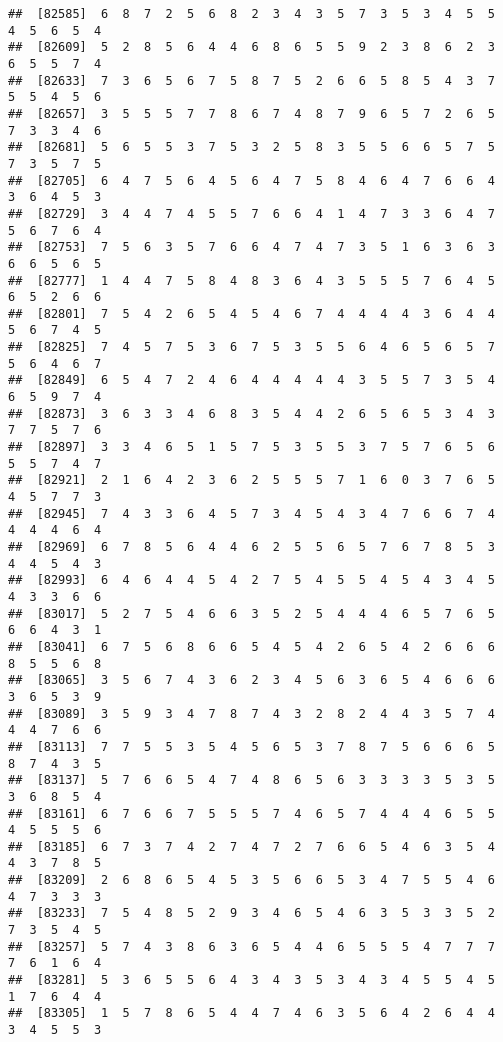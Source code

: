 \documentclass[
]{book}
\begin{document}
\begin{verbatim}
##  [82585]  6  8  7  2  5  6  8  2  3  4  3  5  7  3  5  3  4  5  5  4  5  6  5  4
##  [82609]  5  2  8  5  6  4  4  6  8  6  5  5  9  2  3  8  6  2  3  6  5  5  7  4
##  [82633]  7  3  6  5  6  7  5  8  7  5  2  6  6  5  8  5  4  3  7  5  5  4  5  6
##  [82657]  3  5  5  5  7  7  8  6  7  4  8  7  9  6  5  7  2  6  5  7  3  3  4  6
##  [82681]  5  6  5  5  3  7  5  3  2  5  8  3  5  5  6  6  5  7  5  7  3  5  7  5
##  [82705]  6  4  7  5  6  4  5  6  4  7  5  8  4  6  4  7  6  6  4  3  6  4  5  3
##  [82729]  3  4  4  7  4  5  5  7  6  6  4  1  4  7  3  3  6  4  7  5  6  7  6  4
##  [82753]  7  5  6  3  5  7  6  6  4  7  4  7  3  5  1  6  3  6  3  6  6  5  6  5
##  [82777]  1  4  4  7  5  8  4  8  3  6  4  3  5  5  5  7  6  4  5  6  5  2  6  6
##  [82801]  7  5  4  2  6  5  4  5  4  6  7  4  4  4  4  3  6  4  4  5  6  7  4  5
##  [82825]  7  4  5  7  5  3  6  7  5  3  5  5  6  4  6  5  6  5  7  5  6  4  6  7
##  [82849]  6  5  4  7  2  4  6  4  4  4  4  4  3  5  5  7  3  5  4  6  5  9  7  4
##  [82873]  3  6  3  3  4  6  8  3  5  4  4  2  6  5  6  5  3  4  3  7  7  5  7  6
##  [82897]  3  3  4  6  5  1  5  7  5  3  5  5  3  7  5  7  6  5  6  5  5  7  4  7
##  [82921]  2  1  6  4  2  3  6  2  5  5  5  7  1  6  0  3  7  6  5  4  5  7  7  3
##  [82945]  7  4  3  3  6  4  5  7  3  4  5  4  3  4  7  6  6  7  4  4  4  4  6  4
##  [82969]  6  7  8  5  6  4  4  6  2  5  5  6  5  7  6  7  8  5  3  4  4  5  4  3
##  [82993]  6  4  6  4  4  5  4  2  7  5  4  5  5  4  5  4  3  4  5  4  3  3  6  6
##  [83017]  5  2  7  5  4  6  6  3  5  2  5  4  4  4  6  5  7  6  5  6  6  4  3  1
##  [83041]  6  7  5  6  8  6  6  5  4  5  4  2  6  5  4  2  6  6  6  8  5  5  6  8
##  [83065]  3  5  6  7  4  3  6  2  3  4  5  6  3  6  5  4  6  6  6  3  6  5  3  9
##  [83089]  3  5  9  3  4  7  8  7  4  3  2  8  2  4  4  3  5  7  4  4  4  7  6  6
##  [83113]  7  7  5  5  3  5  4  5  6  5  3  7  8  7  5  6  6  6  5  8  7  4  3  5
##  [83137]  5  7  6  6  5  4  7  4  8  6  5  6  3  3  3  3  5  3  5  3  6  8  5  4
##  [83161]  6  7  6  6  7  5  5  5  7  4  6  5  7  4  4  4  6  5  5  4  5  5  5  6
##  [83185]  6  7  3  7  4  2  7  4  7  2  7  6  6  5  4  6  3  5  4  4  3  7  8  5
##  [83209]  2  6  8  6  5  4  5  3  5  6  6  5  3  4  7  5  5  4  6  4  7  3  3  3
##  [83233]  7  5  4  8  5  2  9  3  4  6  5  4  6  3  5  3  3  5  2  7  3  5  4  5
##  [83257]  5  7  4  3  8  6  3  6  5  4  4  6  5  5  5  4  7  7  7  7  6  1  6  4
##  [83281]  5  3  6  5  5  6  4  3  4  3  5  3  4  3  4  5  5  4  5  1  7  6  4  4
##  [83305]  1  5  7  8  6  5  4  4  7  4  6  3  5  6  4  2  6  4  4  3  4  5  5  3

\end{verbatim}
\end{document}
